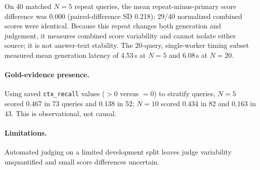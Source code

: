 On 40 matched $N=5$ repeat queries, the
mean repeat-minus-primary score difference
was 0.000 (paired-difference SD 0.218);
29/40 normalized combined scores were
identical. Because this repeat changes both
generation and judgement, it measures combined
score variability and cannot isolate either
source; it is not answer-text stability. The
20-query, single-worker timing subset measured
mean generation latency of 4.53\,s at $N=5$
and 6.08\,s at $N=20$.

\paragraph{Gold-evidence presence.}
Using saved \texttt{ctx\_recall} values
($>0$ versus $=0$) to stratify queries, $N=5$
scored 0.467 in 73 queries and 0.138 in 52;
$N=10$ scored 0.434 in 82 and 0.163 in 43.
This is observational, not causal.

\paragraph{Limitations.}
Automated judging on a limited development
split leaves judge variability unquantified
and small score differences uncertain.